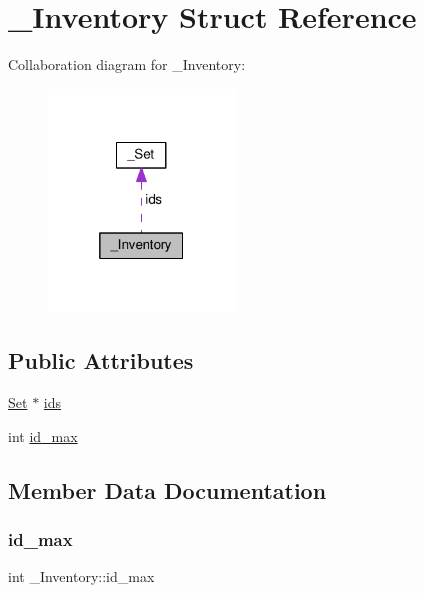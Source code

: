 \hypertarget{struct__Inventory}{}\section{\+\_\+\+Inventory Struct Reference}
\label{struct__Inventory}


Collaboration diagram for \+\_\+\+Inventory\+:\nopagebreak
\begin{figure}[H]
\begin{center}
\leavevmode
\includegraphics[width=140pt]{struct__Inventory__coll__graph}
\end{center}
\end{figure}
\subsection*{Public Attributes}
\begin{DoxyCompactItemize}
\item 
\hyperlink{struct__Set}{Set} $\ast$ \hyperlink{struct__Inventory_a7f6b5d7d1111e7e8f8999c656ae27d0c}{ids}
\item 
int \hyperlink{struct__Inventory_a4b104bc26c8e030cae3032cbe7d940a3}{id\+\_\+max}
\end{DoxyCompactItemize}


\subsection{Member Data Documentation}
\mbox{\label{struct__Inventory_a4b104bc26c8e030cae3032cbe7d940a3}} 
\subsubsection{\texorpdfstring{id\+\_\+max}{id\_max}}
{\footnotesize\ttfamily int \+\_\+\+Inventory\+::id\+\_\+max}

